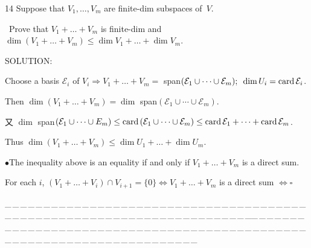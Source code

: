 \documentclass[a4paper, 11pt, UTF8]{article}
\def\card{\textup{card}\,}
\begin{document}
\begin{large}
{\timesbf\Large 14} {\timessl\Large 
Suppose that $V_1,\dots,V_m$ are finite-dim subspaces of \,$V$.}\par\quad\,
{\timessl\Large Prove that $V_1+\dots+V_m$ is finite-dim and $\dim(V_1+\dots+V_m)\leq\dim V_1+\dots+\dim V_m$.
}\par
{\timesbf S\footnotesize{OLUTION:}}\par\quad
Choose a basis $ \mathcal{E}_i$ of $V_i\Rightarrow V_1+\dots+V_m=$ span$( \mathcal{E}_1\cup\cdots\cup \mathcal{E}_m);\,\,\,\dim U_i=\card \mathcal{E}_i$.\par\quad
Then $\dim(V_1+\dots+V_m)=\dim$ span$( \mathcal{E}_1\cup\cdots\cup \mathcal{E}_m)$.\par\quad
又 $\dim$ span$( \mathcal{E}_1\cup\cdots\cup E_m)\leq\card( \mathcal{E}_1\cup\cdots\cup \mathcal{E}_m)\leq\card \mathcal{E}_1+\cdots+\card \mathcal{E}_m$.\par\quad
Thus $\dim(V_1+\dots+V_m)\leq \dim U_1+\dots+\dim U_m.$\par
{\small $\bullet$}{\Large\timessl The inequality above is an equality if and only if $V_1+\dots+V_m$ is a direct sum.}\par\quad
For each $i$, $(V_1+\dots+V_i)\cap V_{i+1}=\{0\}\Longleftrightarrow V_1+\dots+V_m$ is a direct sum $\Longleftrightarrow\square$\par
{\tiny \_\,\_\,\_\,\_\,\_\,\_\,\_\,\_\,\_\,\_\,\_\,\_\,\_\,\_\,\_\,\_\,\_\,\_\,\_\,\_\,\_\,\_\,\_\,\_\,\_\,\_\,\_\,\_\,\_\,\_\,\_\,\_\,\_\,\_\,\_\,\_\,\_\,\_\,\_\,\_\,\_\,\_\,\_\,\_\,\_\,\_\,\_\,\_\,\_\,\_\,\_\,\_\,\_\,\_\,\_\,\_\,\_\,\_\,\_\,\_\,\_\,\_\,\_\,\_\,\_\,\_\,\_\,\_\,\_\,\_\,\_\_\,\_\,\_\,\_\,\_\,\_\,\_\,\_\,\_\,\_\,\_\,\_\,\_\,\_\,\_\,\_\,\_\,\_\,\_\,\_\,\_\,\_\,\_\,\_\,\_\,\_\,\_\,\_\,\_\,\_\,\_\,\_\,\_\,\_\,\_\,\_\,\_\,\_\,\_\,\_\,\_\,\_\,\_\,\_\,\_\,\_\,\_\,\_\,\_\,\_\,\_\,\_\,\_\,\_\,\_\,\_\,\_\,\_\,\_\,\_\,\_\,\_\,\_\,\_\,\_\,\_\,\_\,\_\,\_\,\_\,\_}\par


\end{large}
\end{document}
